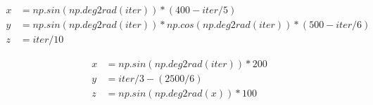 \begin{equation}\label{eq2}
\begin{split}
x &= np.sin(np.deg2rad(iter)) * (400-iter / 5)\\
y &= np.sin(np.deg2rad(iter)) * np.cos(np.deg2rad(iter)) * (500-iter / 6)\\
z &= iter / 10
\end{split}
\end{equation}

\begin{equation}\label{eq3}
\begin{split}
x &= np.sin(np.deg2rad(iter)) * 200\\
y &= iter / 3 - (2500/6)\\
z &= np.sin(np.deg2rad(x))*100
\end{split}
\end{equation}


